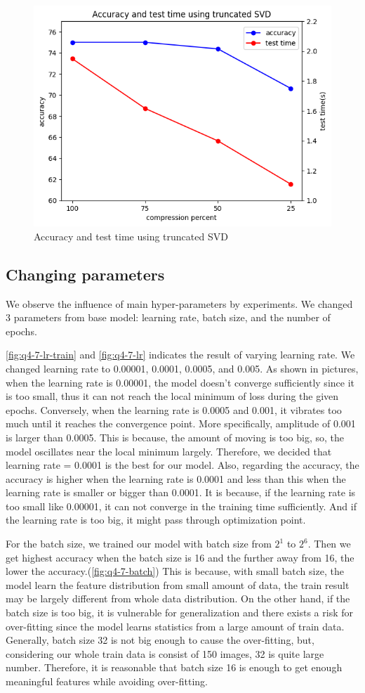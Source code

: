 \begin{figure}[htbp]
	\centering
	\includegraphics[width=0.5\linewidth]{image/q4-6-svd.png}
	\caption{Accuracy and test time using truncated SVD}
	\label{fig:cnn_svd}
\end{figure}

\subsection{Changing parameters}
We observe the influence of main hyper-parameters by experiments. We changed 3 parameters from base model: learning rate, batch size, and the number of epochs.

\cref{fig:q4-7-lr-train} and \cref{fig:q4-7-lr} indicates the result of varying learning rate. We changed learning rate to 0.00001, 0.0001, 0.0005, and 0.005. As shown in pictures, when the learning rate is 0.00001, the model doesn't converge sufficiently since it is too small, thus it can not reach the local minimum of loss during the given epochs. Conversely, when the learning rate is 0.0005 and 0.001, it vibrates too much until it reaches the convergence point. More specifically, amplitude of 0.001 is larger than 0.0005. This is because, the amount of moving is too big, so, the model oscillates near the local minimum largely. Therefore, we decided that learning rate = 0.0001 is the best for our model. Also, regarding the accuracy, the accuracy is higher when the learning rate is 0.0001 and less than this when the learning rate is smaller or bigger than 0.0001. It is because, if the learning rate is too small like 0.00001, it can not converge in the training time sufficiently. And if the learning rate is too big, it might pass through optimization point.

For the batch size, we trained our model with batch size from $2^1$ to $2^6$. Then we get highest accuracy when the batch size is 16 and the further away from 16, the lower the accuracy.(\cref{fig:q4-7-batch}) This is because, with small batch size, the model learn the feature distribution from small amount of data, the train result may be largely different from whole data distribution. On the other hand, if the batch size is too big, it is vulnerable for generalization and there exists a risk for over-fitting since the model learns statistics from a large amount of train data. Generally, batch size 32 is not big enough to cause the over-fitting, but, considering our whole train data is consist of 150 images, 32 is quite large number. Therefore, it is reasonable that batch size 16 is enough to get enough meaningful features while avoiding over-fitting.

